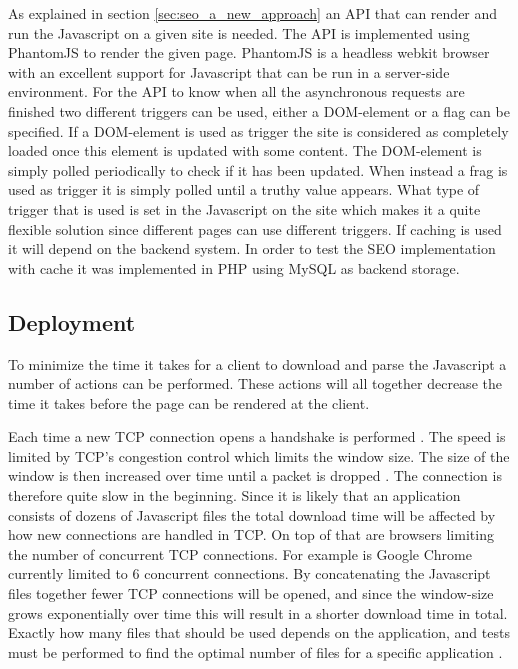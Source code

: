 As explained in section \ref{sec:seo_a_new_approach} an API that can render and run the Javascript on a given site is needed. The API is implemented using PhantomJS to render the given page. PhantomJS is a headless webkit browser with an excellent support for Javascript that can be run in a server-side environment. For the API to know when all the asynchronous requests are finished two different triggers can be used, either a DOM-element or a flag can be specified. If a DOM-element is used as trigger the site is considered as completely loaded once this element is updated with some content. The DOM-element is simply polled periodically to check if it has been updated. When instead a frag is used as trigger it is simply polled until a truthy value appears. What type of trigger that is used is set in the Javascript on the site which makes it a quite flexible solution since different pages can use different triggers. If caching is used it will depend on the backend system. In order to test the SEO implementation with cache it was implemented in PHP using MySQL as backend storage.

\subsection{Deployment}

To minimize the time it takes for a client to download and parse the Javascript a number of actions can be performed. These actions will all together decrease the time it takes before the page can be rendered at the client.

Each time a new TCP connection opens a handshake is performed \cite{tcp_handshake}. The speed is limited by TCP's congestion control which limits the window size. The size of the window is then increased over time until a packet is dropped \cite{tcp_congestion_control}. The connection is therefore quite slow in the beginning. Since it is likely that an application consists of dozens of Javascript files the total download time will be affected by how new connections are handled in TCP. On top of that are browsers limiting the number of concurrent TCP connections. For example is Google Chrome currently limited to 6 concurrent connections. By concatenating the Javascript files together fewer TCP connections will be opened, and since the window-size grows exponentially over time this will result in a shorter download time in total. Exactly how many files that should be used depends on the application, and tests must be performed to find the optimal number of files for a specific application \cite{concat_files}.

